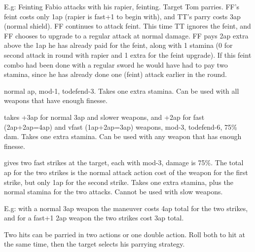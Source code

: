 E.g: Feinting Fabio attacks with his rapier, feinting. Target Tom parries. FF's feint costs only 1ap (rapier is fast+1 to begin with), and TT's parry costs 3ap (normal shield). FF continues to attack feint. This time TT ignores the feint, and FF chooses to upgrade to a regular attack at normal damage. FF pays 2ap extra above the 1ap he has already paid for the feint, along with 1 stamina (0 for second attack in round with rapier and 1 extra for the feint upgrade). If this feint combo had been done with a regular sword he would have had to pay two stamina, since he has already done one (feint) attack earlier in the round.



 normal ap, mod-1, todefend-3. Takes one extra stamina. Can be used with all weapons that have enough finesse.


 takes +3ap for normal 3ap and slower weapons, and +2ap for fast (2ap+2ap=4ap) and vfast (1ap+2ap=3ap) weapons, mod-3, todefend-6, 75\% dam. Takes one extra stamina. Can be used with any weapon that has enough finesse.


 gives two fast strikes at the target, each with mod-3, damage is 75\%. The total ap for the two strikes is the normal attack action cost of the weapon for the first strike, but only 1ap for the second strike. Takes one extra stamina, plus the normal stamina for the two attacks. Cannot be used with slow weapons.

E.g: with a normal 3ap weapon the maneuver costs 4ap total for the two strikes, and for a fast+1 2ap weapon the two strikes cost 3ap total.

Two hits can be parried in two actions or one double action. Roll both to hit at the same time, then the target selects his parrying strategy.


